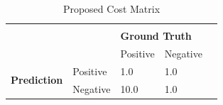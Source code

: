 \begin{table}[]
    \centering
    \begin{tabular}{lllll}
                                             &          &                                           &          & \\
        \multirow{2}{*}{}                    &          & \multicolumn{2}{l}{\textbf{Ground Truth}} &            \\
                                             &          & Positive                                  & Negative & \\
        \multirow{2}{*}{\textbf{Prediction}} & Positive & 1.0                                       & 1.0       & \\
                                             & Negative & 10.0                                      & 1.0       &
    \end{tabular}
    \caption{Proposed Cost Matrix}
    \label{table:confusion_matrix}
\end{table}


